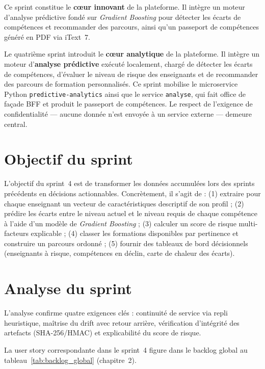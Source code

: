 \documentclass[12pt,a4paper]{report}
\begin{document}
\begin{summaryframe}[frametitle={En bref — Sprint 4}]
Ce sprint constitue le \textbf{cœur innovant} de la plateforme. Il intègre un moteur
d'analyse prédictive fondé sur \textit{Gradient Boosting} pour détecter les écarts de
compétences et recommander des parcours, ainsi qu'un passeport de compétences généré
en PDF via iText~7.
\end{summaryframe}

Le quatrième sprint introduit le \textbf{cœur analytique} de la plateforme. Il intègre un moteur
d'\textbf{analyse prédictive} exécuté localement, chargé de détecter les écarts de
compétences, d'évaluer le niveau de risque des enseignants et de recommander des
parcours de formation personnalisés. Ce sprint mobilise le microservice Python
\texttt{predictive-analytics} ainsi que le service \texttt{analyse}, qui fait office de
façade BFF et produit le passeport de compétences. Le respect de l'exigence de
confidentialité — aucune donnée n'est envoyée à un service externe — demeure central.

\section{Objectif du sprint}

L'objectif du sprint~4 est de transformer les données accumulées lors des sprints
précédents en décisions actionnables. Concrètement, il s'agit de : (1) extraire pour
chaque enseignant un vecteur de caractéristiques descriptif de son profil ; (2)
prédire les écarts entre le niveau actuel et le niveau requis de chaque compétence à
l'aide d'un modèle de \textit{Gradient Boosting} ; (3) calculer un score de risque
multi-facteurs explicable ; (4) classer les formations disponibles par pertinence et
construire un parcours ordonné ; (5) fournir des tableaux de bord décisionnels
(enseignants à risque, compétences en déclin, carte de chaleur des écarts).

\section{Analyse du sprint}

L'analyse confirme quatre exigences clés : continuité de service via repli
heuristique, maîtrise du drift avec retour arrière, vérification d'intégrité des
artefacts (SHA-256/HMAC) et explicabilité du score de risque.

La user story correspondante dans le sprint~4 figure dans le backlog global au
tableau~\ref{tab:backlog_global} (chapitre~2).
\end{document}
